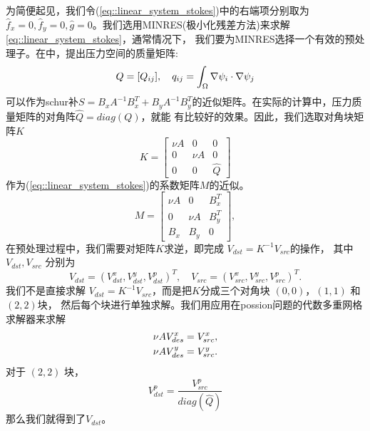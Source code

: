      为简便起见，我们令(\ref{eq::linear_system_stokes})中的右端项分别取为
     $\hat{f}_x = 0, \hat{f}_y = 0, \hat{g} = 0$。我们选用MINRES(极小化残差方法)来求解\eqref{eq::linear_system_stokes}，通常情况下，
     我们要为MINRES选择一个有效的预处理子。在\cite{elman2005finite}中，提出压力空间的质量矩阵:
     \begin{equation}
        Q  =  [Q_{ij}], \quad q_{ij} = \int_\Omega \nabla \psi_i \cdot \nabla \psi_j  \notag
     \end{equation}
     可以作为schur补$S = B_x A^{-1} B_x^T + B_y A^{-1} B_y^T$的近似矩阵。在实际的计算中，压力质量矩阵的对角阵$\hat{Q} = diag(Q)$，就能
     有比较好的效果。因此，我们选取对角块矩阵$K$
       \begin{equation}
         K = \left[
               \begin{array}{lll}
                 \nu A & 0 & 0 \\
                 0 & \nu A  & 0 \\
                 0 & 0 & \hat{Q}
               \end{array}
             \right]
       \end{equation}
       作为(\eqref{eq::linear_system_stokes})的系数矩阵$M$的近似。
       \begin{equation}
         M = \left[
               \begin{array}{lll}
                 \nu A & 0 & B_x^T \\
                 0 & \nu A  & B_y^T \\
                 B_x & B_y & 0
               \end{array}
             \right],
       \end{equation}
   在预处理过程中，我们需要对矩阵$K$求逆，即完成 $V_{dst} = K^{-1} V_{src}$的操作，
   其中$V_{dst}, V_{src}$ 分别为
   \begin{equation}
      V_{dst} = (V_{dst}^x, V_{dst}^y, V_{dst}^p)^T,\quad V_{src} = (V_{src}^x, V_{src}^y, V_{src}^p)^T.
   \end{equation}
   我们不是直接求解 $V_{dst} = K^{-1} V_{src}$，而是把$K$分成三个对角块 $(0, 0)$，$(1, 1)$ 和 $(2, 2)$块，
   然后每个块进行单独求解。我们用应用在possion问题的代数多重网格求解器来求解
   \begin{eqnarray}
      \nu A V_{des}^x = V_{src}^x, \notag \\
      \nu A V_{des}^y = V_{src}^y. \notag
   \end{eqnarray}
   对于 $(2, 2)$ 块，
   \begin{equation}
      V_{dst}^p = \frac{V_{src}^p}{diag(\hat{Q})}
   \end{equation}
   那么我们就得到了$V_{dst}$。

